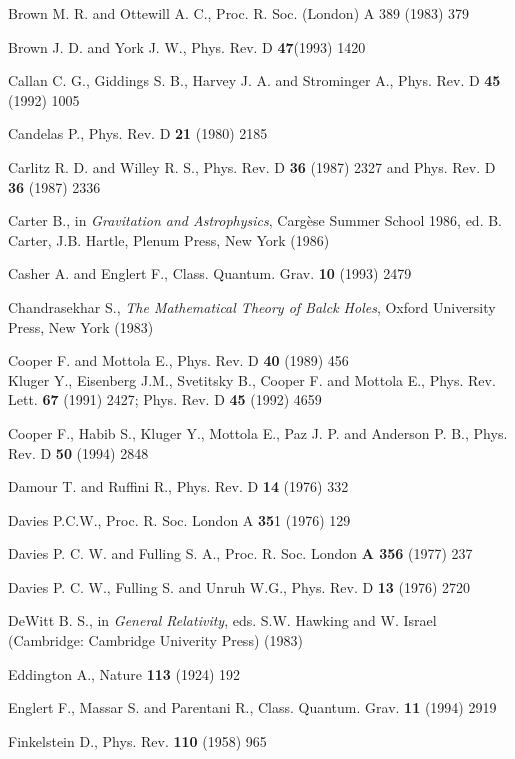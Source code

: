 \documentclass[12pt,oneside]{report}
\begin{document}
\begin{thebibliography}{999}
Brown M. R. and Ottewill A. C., Proc. R. Soc. (London) A 389
(1983) 379

Brown J. D. and York J. W., Phys. Rev. D {\bf 47}(1993) 1420

 Callan C. G., Giddings S. B., Harvey J. A. and Strominger A.,
Phys. Rev. D {\bf 45} (1992) 1005


 Candelas P., Phys. Rev. D {\bf 21} (1980) 2185

 Carlitz R. D. and Willey R. S., Phys. Rev. D {\bf 36}
(1987) 2327 and Phys. Rev. D {\bf 36}
(1987) 2336

Carter B., in {\em Gravitation and Astrophysics}, 
Carg\`ese Summer School
1986, ed. B. Carter, J.B. Hartle, Plenum Press, New York (1986)

 Casher A. and Englert F., Class. Quantum. Grav. {\bf 10} (1993) 2479


Chandrasekhar S., {\em The Mathematical Theory of Balck Holes},
Oxford University Press, New York (1983)

Cooper F. and Mottola E., Phys. Rev. D {\bf 40} (1989) 456
\\
Kluger Y., Eisenberg J.M., Svetitsky B., Cooper F. and Mottola E., 
Phys.
Rev. Lett. {\bf 67} (1991) 2427;  Phys. Rev. D {\bf 45} (1992) 4659

Cooper F., Habib S., Kluger Y., Mottola E., 
Paz J. P. and Anderson P. B., Phys. Rev. D {\bf 50} (1994) 2848


Damour T. and Ruffini R., Phys. Rev. D {\bf 14} (1976) 332

Davies P.C.W., Proc. R. Soc. London A {\bf 35}1 (1976) 129

 Davies P. C. W. and Fulling S. A., Proc. R. Soc. 
London {\bf A 356} (1977) 237


Davies P. C. W., Fulling S. and  Unruh W.G., Phys. Rev. D {\bf 13} (1976)
2720

DeWitt B. S., in {\em General Relativity}, eds. S.W. Hawking
and
W. Israel (Cambridge: Cambridge Univerity Press) (1983)

Eddington A., Nature {\bf 113} (1924) 192

 Englert F., Massar S. and Parentani R.,
 Class. Quantum. Grav. {\bf 11} (1994) 2919

Finkelstein D., Phys. Rev. {\bf 110} (1958) 965


\end{thebibliography}
\end{document}
